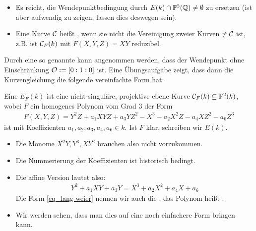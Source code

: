 \begin{bem}
	\begin{itemize}
		\item Es reicht, die Wendepunktbedingung durch $E(k) \cap \mathbb{P}^2(\mathbb{Q}) \neq \emptyset$ zu ersetzen (ist aber aufwendig zu zeigen, lassen dies deswegen sein).
		\item Eine Kurve $\mathcal{C}$ heißt , wenn sie nicht die Vereinigung zweier Kurven $\neq \mathcal{C}$ ist, z.B. ist $\mathcal{C}_F(k)$ mit $F(X,Y,Z) = XY$ reduzibel. 
	\end{itemize}
\end{bem}

\begin{bem}
	Durch eine so genannte  kann angenommen werden, dass der Wendepunkt ohne Einschränkung $\mathcal{O} := [0:1:0]$ ist. Eine Übungsaufgabe zeigt, dass dann die Kurvengleichung die folgende vereinfachte Form hat:
\end{bem}

\begin{defn}
	Eine  $E_F(k)$ ist eine nicht-singuläre, projektive ebene Kurve $\mathcal{C}_F(k) \subseteq \mathbb{P}^2(k)$, wobei $F$ ein homogenes Polynom vom Grad $3$ der Form
	\begin{equation}
	\begin{aligned}
		F(X,Y,Z) = Y^2 Z + a_1 XYZ + a_3 YZ^2 - X^3 - a_2X^2 Z - a_4 XZ^2 - a_6Z^3 \label{eq_lang-weier}
	\end{aligned}
	\end{equation}
	ist mit Koeffizienten $a_1,a_2,a_3,a_4,a_6 \in k$. Ist $F$ klar, schreiben wir $E(k)$. 
\end{defn}
\setcounter{counter}{3}
\begin{bem}
	\begin{itemize}
		\item Die Monome $X^2Y, Y^3, XY^2$ brauchen also nicht vorzukommen.
		\item Die Nummerierung der Koeffizienten ist historisch bedingt.
		\item Die affine Version lautet also:
		\begin{equation}
		\begin{aligned}
			Y^2 + a_1 XY + a_3 Y = X^3 + a_2 X^2 + a_4 X + a_6 \label{eq_lang-weier-aff}
		\end{aligned}
		\end{equation}
		Die Form \eqref{eq_lang-weier} nennen wir auch die , das Polynom heißt .
		\item Wir werden sehen, dass man dies auf eine noch einfachere Form bringen kann.
	\end{itemize}
\end{bem}

